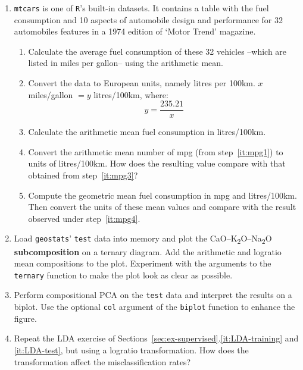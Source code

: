 \begin{enumerate}

\item \texttt{mtcars} is one of \texttt{R}'s built-in datasets. It
  contains a table with the fuel consumption and 10 aspects of
  automobile design and performance for 32 automobiles features in a
  1974 edition of `Motor Trend' magazine.
  \begin{enumerate}
    \item\label{it:mpg1} Calculate the average fuel consumption of
      these 32 vehicles --which are listed in miles per gallon-- using
      the arithmetic mean.
    \item\label{it:mpg2} Convert the data to European units, namely
      litres per 100km. $x$ miles/gallon $= y$ litres/100km,
      where:
      \[
      y = \frac{235.21}{x}
      \]
    \item\label{it:mpg3} Calculate the arithmetic mean fuel
      consumption in litres/100km.
    \item\label{it:mpg4} Convert the arithmetic mean number of mpg
      (from step~\ref{it:mpg1}) to units of litres/100km.  How does
      the resulting value compare with that obtained from
      step~\ref{it:mpg3}?
    \item\label{it:mpg5} Compute the geometric mean fuel consumption
      in mpg and litres/100km. Then convert the units of these mean
      values and compare with the result observed under
      step~\ref{it:mpg4}.
  \end{enumerate}

\item Load \texttt{geostats}' \texttt{test} data into memory and plot
  the CaO--K\textsubscript{2}O--Na\textsubscript{2}O
  \textbf{subcomposition} on a ternary diagram. Add the arithmetic and
  logratio mean compositions to the plot. Experiment with the
  arguments to the \texttt{ternary} function to make the plot look as
  clear as possible.

\item Perform compositional PCA on the \texttt{test} data and
  interpret the results on a biplot. Use the optional \texttt{col}
  argument of the \texttt{biplot} function to enhance the figure.
  
\item Repeat the LDA exercise of
  Sections~\ref{sec:ex-supervised}.\ref{it:LDA-training} and
  \ref{it:LDA-test}, but using a logratio transformation. How does the
  transformation affect the misclassification rates?
  
\end{enumerate}

